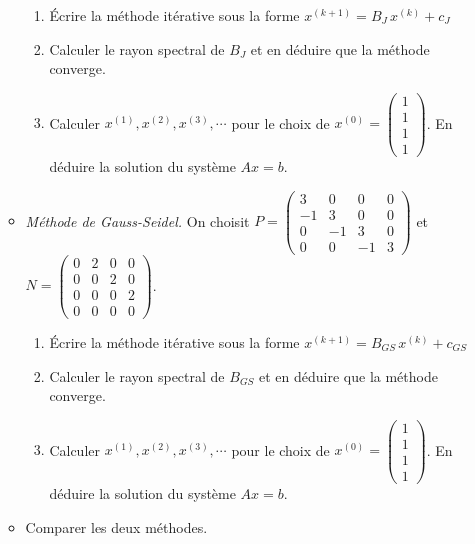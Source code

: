 \documentclass[a4paper]{article}
\begin{document}
\begin{enumerate}
\begin{itemize}
\begin{enumerate}
\item Écrire la méthode itérative sous la forme $x^{(k+1)}=B_J\,x^{(k)}+c_J$
\item Calculer le rayon spectral de $B_J$ et en déduire que la méthode converge.
\item Calculer $x^{(1)}, x^{(2)}, x^{(3)},\cdots$ pour le choix de $x^{(0)}=\left(\begin{array}{c}
1\\1\\1\\1
\end{array}\right)$. En déduire la solution du système $Ax=b$.
\end{enumerate}
\item {\it Méthode de Gauss-Seidel.} On choisit 
$P=\left(\begin{array}{cccc}
3& 0& 0& 0\\
-1& 3& 0& 0\\
0& -1& 3& 0 \\
0& 0& -1& 3
\end{array}\right)$ et $N=\left(\begin{array}{cccc}
0&2&0&0\\
0&0&2&0\\
0&0&0&2 \\
0&0&0&0
\end{array}\right)$. 

\begin{enumerate}
\item Écrire la méthode itérative sous la forme $x^{(k+1)}=B_{GS}\,x^{(k)}+c_{GS}$
\item Calculer le rayon spectral de $B_{GS}$ et en déduire que la méthode converge.
\item Calculer $x^{(1)}, x^{(2)}, x^{(3)},\cdots$ pour le choix de $x^{(0)}=\left(\begin{array}{c}
1\\1\\1\\1 
\end{array}\right)$. En déduire la solution du système $Ax=b$.
\end{enumerate}
\item Comparer les deux méthodes.

\end{itemize}

\end{enumerate}
\end{document}
